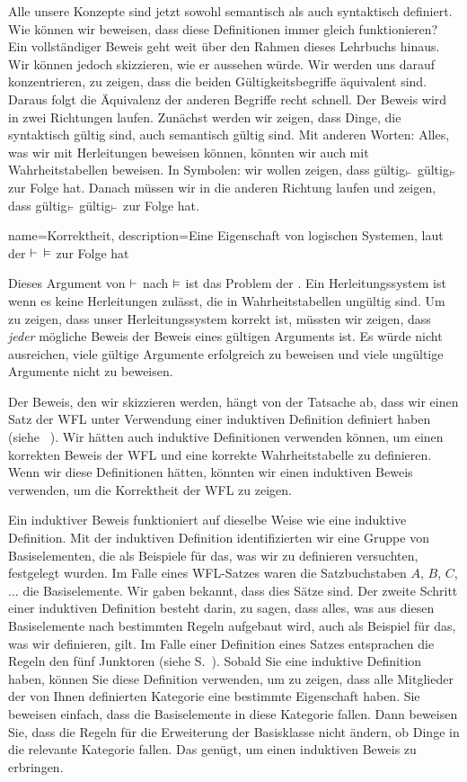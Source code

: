 Alle unsere Konzepte sind jetzt sowohl semantisch als auch syntaktisch definiert. Wie können wir beweisen, dass diese Definitionen immer gleich funktionieren? Ein vollständiger Beweis geht weit über den Rahmen dieses Lehrbuchs hinaus. Wir können jedoch skizzieren, wie er aussehen würde. Wir werden uns darauf konzentrieren, zu zeigen, dass die beiden Gültigkeitsbegriffe äquivalent sind.  Daraus folgt die Äquivalenz der anderen Begriffe recht schnell. Der Beweis wird in zwei Richtungen laufen. Zunächst werden wir zeigen, dass Dinge, die syntaktisch gültig sind, auch semantisch gültig sind. Mit anderen Worten: Alles, was wir mit Herleitungen beweisen können, könnten wir auch mit Wahrheitstabellen beweisen. In Symbolen: wir wollen zeigen, dass gültig$_{\vdash}$ gültig$_{\vDash}$ zur Folge hat. Danach müssen wir in die anderen Richtung laufen und zeigen, dass gültig$_{\vDash}$ gültig$_{\vdash}$ zur Folge hat.

{
name=Korrektheit,
description={Eine Eigenschaft von logischen Systemen, laut der $\vdash$ $\vDash$ zur Folge hat}
}

Dieses Argument von $\vdash $ nach $\vDash$ ist das Problem der . Ein Herleitungssystem ist  wenn es keine Herleitungen zulässt, die in Wahrheitstabellen ungültig sind. Um zu zeigen, dass unser Herleitungssystem korrekt ist, müssten wir zeigen, dass \emph{jeder} mögliche Beweis der Beweis eines gültigen Arguments ist. Es würde nicht ausreichen, viele gültige Argumente erfolgreich zu beweisen und viele ungültige Argumente nicht zu beweisen.

Der Beweis, den wir skizzieren werden, hängt von der Tatsache ab, dass wir einen Satz der WFL unter Verwendung einer induktiven Definition definiert haben (siehe ~\pageref{TFLsentences}). Wir hätten auch induktive Definitionen verwenden können, um einen korrekten Beweis der WFL und eine korrekte Wahrheitstabelle zu definieren. Wenn wir diese Definitionen hätten, könnten wir einen induktiven Beweis verwenden, um die Korrektheit der WFL zu zeigen. 

Ein induktiver Beweis funktioniert auf dieselbe Weise wie eine induktive Definition. Mit der induktiven Definition identifizierten wir eine Gruppe von Basiselementen, die als Beispiele für das, was wir zu definieren versuchten, festgelegt wurden. Im Falle eines WFL-Satzes waren die Satzbuchstaben $A$, $B$, $C$, $\dots$ die Basiselemente. Wir gaben bekannt, dass dies Sätze sind. Der zweite Schritt einer induktiven Definition besteht darin, zu sagen, dass alles, was aus diesen Basiselemente nach bestimmten Regeln aufgebaut wird, auch als Beispiel für das, was wir definieren, gilt. Im Falle einer Definition eines Satzes entsprachen die Regeln den fünf Junktoren (siehe S.~\pageref{TFLsentences}). Sobald Sie eine induktive Definition haben, können Sie diese Definition verwenden, um zu zeigen, dass alle Mitglieder der von Ihnen definierten Kategorie eine bestimmte Eigenschaft haben. Sie beweisen einfach, dass die Basiselemente in diese Kategorie fallen. Dann beweisen Sie, dass die Regeln für die Erweiterung der Basisklasse nicht ändern, ob Dinge in die relevante Kategorie fallen. Das genügt, um einen induktiven Beweis zu erbringen.

